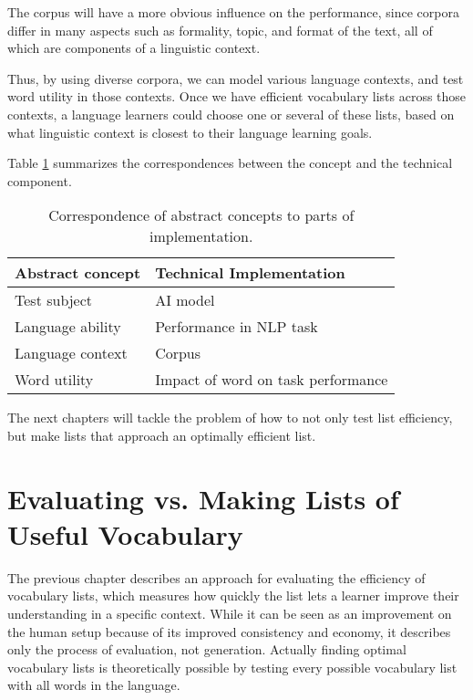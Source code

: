 The corpus will have a more obvious influence on the performance, since corpora differ in many aspects such as formality, topic, and format of the text, all of which are components of a linguistic context.

Thus, by using diverse corpora, we can model various language contexts, and test word utility in those contexts.
Once we have efficient vocabulary lists across those contexts, a language learners could choose one or several of these lists, based on what linguistic context is closest to their language learning goals.


Table \ref{table:concept-implementation-correspondence} summarizes the correspondences between the concept and the technical component.

\begin{table}[ht]
	\centering
	\begin{tabularx}{\textwidth}{|X|X|}
		\hline
		\textbf{Abstract concept} & \textbf{Technical Implementation}  \\
		\hline
		Test subject              & AI model                           \\
		\hline
		Language ability          & Performance in NLP task            \\
		\hline
		Language context          & Corpus                             \\
		\hline
		Word utility              & Impact of word on task performance \\
		\hline
	\end{tabularx}
	\caption{Correspondence of abstract concepts to parts of implementation.}
	\label{table:concept-implementation-correspondence}
\end{table}

The next chapters will tackle the problem of how to not only test list efficiency, but make lists that approach an optimally efficient list.

\section{Evaluating vs. Making Lists of Useful Vocabulary} \label{sec:eval-vs-creation}
The previous chapter describes an approach for evaluating the efficiency of vocabulary lists, which measures how quickly the list lets a learner improve their understanding in a specific context.
While it can be seen as an improvement on the human setup because of its improved consistency and economy, it describes only the process of evaluation, not generation.
Actually finding optimal vocabulary lists is theoretically possible by testing every possible vocabulary list with all words in the language.


